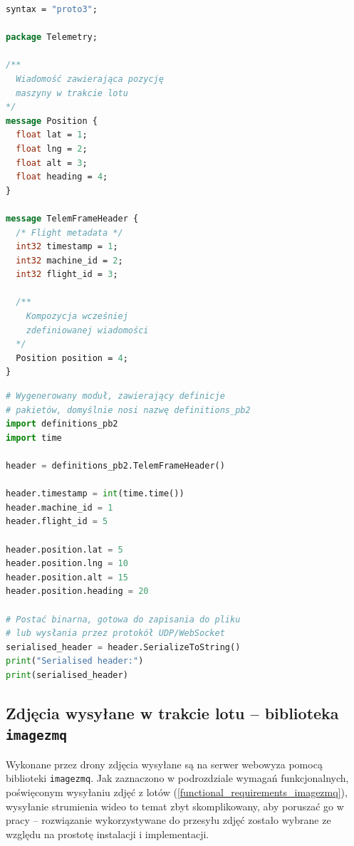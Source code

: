 \begin{lstlisting}[language=protobuf, label=list:protobuf,caption=Przykład definicji pakietu \texttt{protobuf}, basicstyle=\footnotesize\ttfamily]
syntax = "proto3";

package Telemetry;

/**
  Wiadomość zawierająca pozycję
  maszyny w trakcie lotu
*/
message Position {
  float lat = 1;
  float lng = 2;
  float alt = 3;
  float heading = 4;
}

message TelemFrameHeader {
  /* Flight metadata */
  int32 timestamp = 1;
  int32 machine_id = 2;
  int32 flight_id = 3;

  /**
	Kompozycja wcześniej
	zdefiniowanej wiadomości 
  */
  Position position = 4;
}
\end{lstlisting}

\begin{lstlisting}[language=Python, label=list:protobuf,caption=Przykład wykorzystania wygenerowanej implementacji pakietów w języku Python,basicstyle=\footnotesize\ttfamily]
# Wygenerowany moduł, zawierający definicje
# pakietów, domyślnie nosi nazwę definitions_pb2
import definitions_pb2
import time

header = definitions_pb2.TelemFrameHeader()

header.timestamp = int(time.time())
header.machine_id = 1
header.flight_id = 5

header.position.lat = 5
header.position.lng = 10
header.position.alt = 15
header.position.heading = 20

# Postać binarna, gotowa do zapisania do pliku
# lub wysłania przez protokół UDP/WebSocket
serialised_header = header.SerializeToString()
print("Serialised header:")
print(serialised_header) 
\end{lstlisting}

\subsection{Zdjęcia wysyłane w trakcie lotu -- biblioteka \texttt{imagezmq}}

Wykonane przez drony zdjęcia wysyłane są na serwer webowyza pomocą biblioteki
\texttt{imagezmq}. Jak zaznaczono w podrozdziale wymagań funkcjonalnych, 
poświęconym wysyłaniu zdjęć z lotów (\ref{functional_requirements_imagezmq}),
wysyłanie strumienia wideo to temat zbyt skomplikowany, aby poruszać go w
pracy -- rozwiązanie wykorzystywane
do przesyłu zdjęć zostało wybrane ze względu na prostotę instalacji i implementacji.

